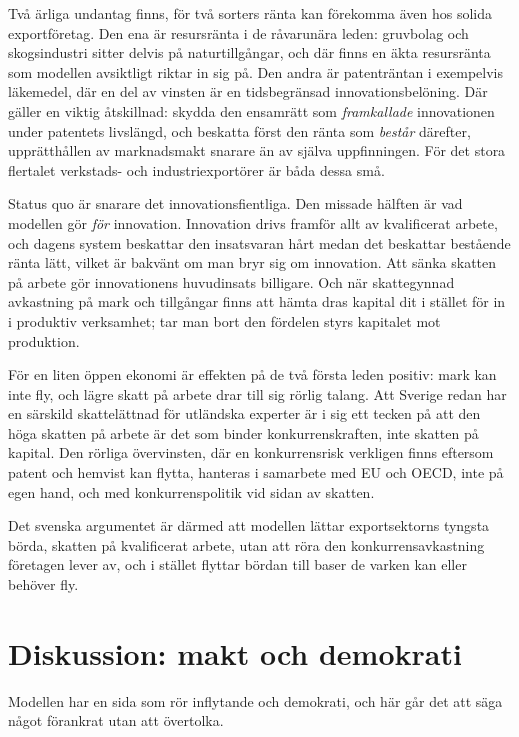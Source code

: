 \documentclass[11pt]{article}
\begin{document}
Två ärliga undantag finns, för två sorters ränta kan förekomma även hos solida exportföretag. Den ena är resursränta i de råvarunära leden: gruvbolag och skogsindustri sitter delvis på naturtillgångar, och där finns en äkta resursränta som modellen avsiktligt riktar in sig på. Den andra är patenträntan i exempelvis läkemedel, där en del av vinsten är en tidsbegränsad innovationsbelöning. Där gäller en viktig åtskillnad: skydda den ensamrätt som \emph{framkallade} innovationen under patentets livslängd, och beskatta först den ränta som \emph{består} därefter, upprätthållen av marknadsmakt snarare än av själva uppfinningen. För det stora flertalet verkstads- och industriexportörer är båda dessa små.

Status quo är snarare det innovationsfientliga. Den missade hälften är vad modellen gör \emph{för} innovation. Innovation drivs framför allt av kvalificerat arbete, och dagens system beskattar den insatsvaran hårt medan det beskattar bestående ränta lätt, vilket är bakvänt om man bryr sig om innovation. Att sänka skatten på arbete gör innovationens huvudinsats billigare. Och när skattegynnad avkastning på mark och tillgångar finns att hämta dras kapital dit i stället för in i produktiv verksamhet; tar man bort den fördelen styrs kapitalet mot produktion.

För en liten öppen ekonomi är effekten på de två första leden positiv: mark kan inte fly, och lägre skatt på arbete drar till sig rörlig talang. Att Sverige redan har en särskild skattelättnad för utländska experter är i sig ett tecken på att den höga skatten på arbete är det som binder konkurrenskraften, inte skatten på kapital. Den rörliga övervinsten, där en konkurrensrisk verkligen finns eftersom patent och hemvist kan flytta, hanteras i samarbete med EU och OECD, inte på egen hand, och med konkurrenspolitik vid sidan av skatten.

Det svenska argumentet är därmed att modellen lättar exportsektorns tyngsta börda, skatten på kvalificerat arbete, utan att röra den konkurrensavkastning företagen lever av, och i stället flyttar bördan till baser de varken kan eller behöver fly.

\section{Diskussion: makt och demokrati}

Modellen har en sida som rör inflytande och demokrati, och här går det att säga något förankrat utan att övertolka.
\end{document}
